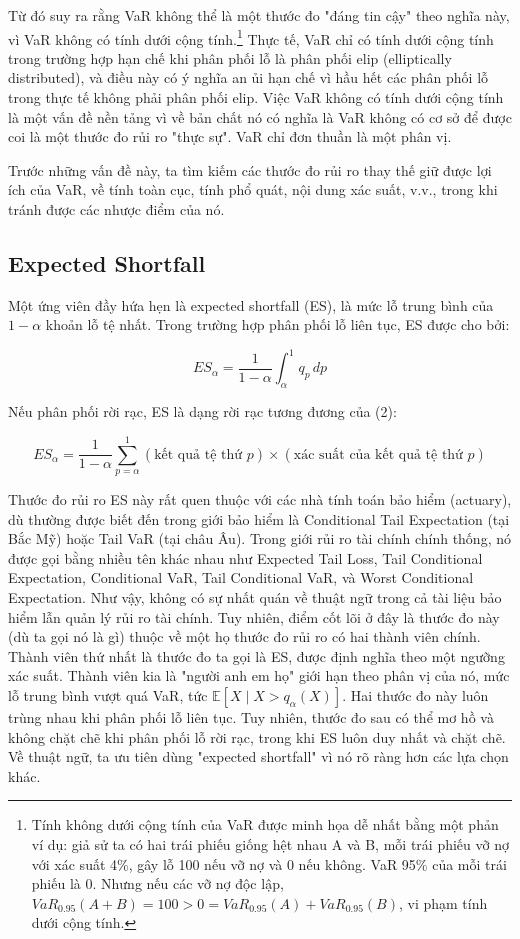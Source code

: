 Từ đó suy ra rằng VaR không thể là một thước đo "đáng tin cậy" theo nghĩa này, vì VaR không có tính dưới cộng tính.\footnote{Tính không dưới cộng tính của VaR được minh họa dễ nhất bằng một phản ví dụ: giả sử ta có hai trái phiếu giống hệt nhau A và B, mỗi trái phiếu vỡ nợ với xác suất 4\%, gây lỗ 100 nếu vỡ nợ và 0 nếu không. VaR 95\% của mỗi trái phiếu là 0. Nhưng nếu các vỡ nợ độc lập, $VaR_{0.95}(A+B) = 100 > 0 = VaR_{0.95}(A) + VaR_{0.95}(B)$, vi phạm tính dưới cộng tính.} Thực tế, VaR chỉ có tính dưới cộng tính trong trường hợp hạn chế khi phân phối lỗ là phân phối elip (elliptically distributed), và điều này có ý nghĩa an ủi hạn chế vì hầu hết các phân phối lỗ trong thực tế không phải phân phối elip. Việc VaR không có tính dưới cộng tính là một vấn đề nền tảng vì về bản chất nó có nghĩa là VaR không có cơ sở để được coi là một thước đo rủi ro "thực sự". VaR chỉ đơn thuần là một phân vị.

Trước những vấn đề này, ta tìm kiếm các thước đo rủi ro thay thế giữ được lợi ích của VaR, về tính toàn cục, tính phổ quát, nội dung xác suất, v.v., trong khi tránh được các nhược điểm của nó.

\subsection{Expected Shortfall}

Một ứng viên đầy hứa hẹn là expected shortfall (ES), là mức lỗ trung bình của $1-\alpha$ khoản lỗ tệ nhất. Trong trường hợp phân phối lỗ liên tục, ES được cho bởi:

\begin{equation*}
ES_\alpha = \frac{1}{1-\alpha} \int_\alpha^1 q_p \, dp \tag{2}
\end{equation*}

Nếu phân phối rời rạc, ES là dạng rời rạc tương đương của (2):

\begin{equation*}
ES_\alpha = \frac{1}{1-\alpha} \sum_{p=\alpha}^{1} (\text{kết quả tệ thứ } p) \times (\text{xác suất của kết quả tệ thứ } p) \tag{3}
\end{equation*}

Thước đo rủi ro ES này rất quen thuộc với các nhà tính toán bảo hiểm (actuary), dù thường được biết đến trong giới bảo hiểm là Conditional Tail Expectation (tại Bắc Mỹ) hoặc Tail VaR (tại châu Âu). Trong giới rủi ro tài chính chính thống, nó được gọi bằng nhiều tên khác nhau như Expected Tail Loss, Tail Conditional Expectation, Conditional VaR, Tail Conditional VaR, và Worst Conditional Expectation. Như vậy, không có sự nhất quán về thuật ngữ trong cả tài liệu bảo hiểm lẫn quản lý rủi ro tài chính. Tuy nhiên, điểm cốt lõi ở đây là thước đo này (dù ta gọi nó là gì) thuộc về một họ thước đo rủi ro có hai thành viên chính. Thành viên thứ nhất là thước đo ta gọi là ES, được định nghĩa theo một ngưỡng xác suất. Thành viên kia là "người anh em họ" giới hạn theo phân vị của nó, mức lỗ trung bình vượt quá VaR, tức $\mathbb{E}[X \mid X > q_\alpha(X)]$. Hai thước đo này luôn trùng nhau khi phân phối lỗ liên tục. Tuy nhiên, thước đo sau có thể mơ hồ và không chặt chẽ khi phân phối lỗ rời rạc, trong khi ES luôn duy nhất và chặt chẽ. Về thuật ngữ, ta ưu tiên dùng "expected shortfall" vì nó rõ ràng hơn các lựa chọn khác.

